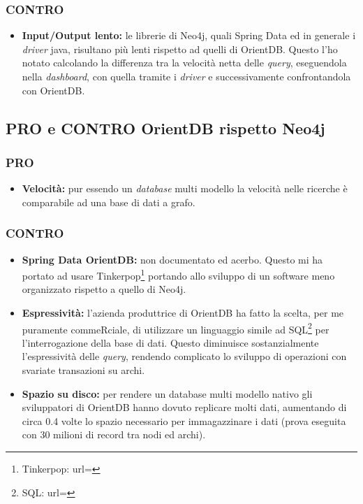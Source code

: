 \subsubsection{CONTRO}
\begin{itemize}
\item{\textbf{Input/Output lento:}} le librerie di Neo4j, quali Spring Data ed in generale i \textit{driver} java, risultano più lenti rispetto ad quelli di OrientDB. Questo l'ho notato calcolando la differenza tra la velocità netta delle \textit{query}, eseguendola nella \textit{dashboard}, con quella tramite i \textit{driver} e successivamente confrontandola con OrientDB.
\end{itemize}
\subsection{PRO e CONTRO OrientDB rispetto Neo4j}
\subsubsection{PRO}
\begin{itemize}
\item{\textbf{Velocità:}} pur essendo un \textit{database} multi modello la velocità nelle ricerche è comparabile ad una base di dati a grafo.
\end{itemize}
\subsubsection{CONTRO}
\begin{itemize}
\item{\textbf{Spring Data OrientDB:}} non documentato ed acerbo. Questo mi ha portato ad usare Tinkerpop\footnote{Tinkerpop: url= } portando allo sviluppo di un software meno organizzato rispetto a quello di Neo4j.
\item{\textbf{Espressività:}} l'azienda produttrice di OrientDB ha fatto la scelta, per me puramente commeRciale, di utilizzare un linguaggio simile ad SQL\footnote{SQL: url= } per l'interrogazione della base di dati. Questo diminuisce sostanzialmente l'espressività delle \textit{query}, rendendo complicato lo sviluppo di operazioni con svariate transazioni su archi.
\item{\textbf{Spazio su disco:}} per rendere un database multi modello nativo gli sviluppatori di OrientDB hanno dovuto replicare molti dati, aumentando di circa 0.4 volte lo spazio necessario per immagazzinare i dati (prova eseguita con 30 milioni di record tra nodi ed archi).
\end{itemize}

